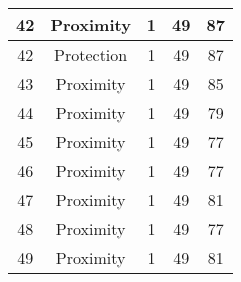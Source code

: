 \documentclass[results.tex]{subfiles}
\begin{document}
\begin{center}
\begin{tabular}{| c || c | c | c | c |}
            \hline
            42                      & Proximity                    & 1                      & 49                      & 87                   \\
            \hline
            42                      & Protection                   & 1                      & 49                      & 87                   \\
            \hline
            43                      & Proximity                    & 1                      & 49                      & 85                   \\
            \hline
            44                      & Proximity                    & 1                      & 49                      & 79                   \\
            \hline
            45                      & Proximity                    & 1                      & 49                      & 77                   \\
            \hline
            46                      & Proximity                    & 1                      & 49                      & 77                   \\
            \hline
            47                      & Proximity                    & 1                      & 49                      & 81                   \\
            \hline
            48                      & Proximity                    & 1                      & 49                      & 77                   \\
            \hline
            49                      & Proximity                    & 1                      & 49                      & 81                   \\
            \hline
        \end{tabular}
    \end{center}
\end{document}
